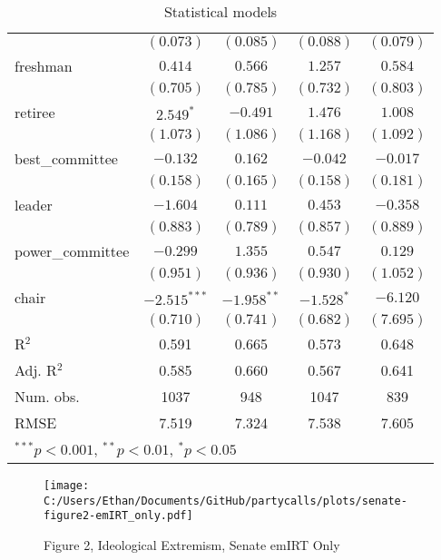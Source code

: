 \documentclass[12pt]{article}
\begin{document}
\begin{table}
\begin{center}
\begin{tabular}{l c c c c }
			& $(0.073)$      & $(0.085)$     & $(0.088)$     & $(0.079)$     \\
			freshman               & $0.414$        & $0.566$       & $1.257$       & $0.584$       \\
			& $(0.705)$      & $(0.785)$     & $(0.732)$     & $(0.803)$     \\
			retiree                & $2.549^{*}$    & $-0.491$      & $1.476$       & $1.008$       \\
			& $(1.073)$      & $(1.086)$     & $(1.168)$     & $(1.092)$     \\
			best\_committee        & $-0.132$       & $0.162$       & $-0.042$      & $-0.017$      \\
			& $(0.158)$      & $(0.165)$     & $(0.158)$     & $(0.181)$     \\
			leader                 & $-1.604$       & $0.111$       & $0.453$       & $-0.358$      \\
			& $(0.883)$      & $(0.789)$     & $(0.857)$     & $(0.889)$     \\
			power\_committee       & $-0.299$       & $1.355$       & $0.547$       & $0.129$       \\
			& $(0.951)$      & $(0.936)$     & $(0.930)$     & $(1.052)$     \\
			chair                  & $-2.515^{***}$ & $-1.958^{**}$ & $-1.528^{*}$  & $-6.120$      \\
			& $(0.710)$      & $(0.741)$     & $(0.682)$     & $(7.695)$     \\
			\hline
			R$^2$                  & 0.591          & 0.665         & 0.573         & 0.648         \\
			Adj. R$^2$             & 0.585          & 0.660         & 0.567         & 0.641         \\
			Num. obs.              & 1037           & 948           & 1047          & 839           \\
			RMSE                   & 7.519          & 7.324         & 7.538         & 7.605         \\
			\hline
			\multicolumn{5}{l}{\scriptsize{$^{***}p<0.001$, $^{**}p<0.01$, $^*p<0.05$}}
		\end{tabular}
		\caption{Statistical models}
		\label{table:coefficients}
	\end{center}
\end{table}
			
			

\begin{figure}[h]
	\caption{Figure 2, Ideological Extremism, Senate emIRT Only}
	\centering
	\texttt{[image: C:/Users/Ethan/Documents/GitHub/partycalls/plots/senate-figure2-emIRT\_only.pdf]}
	
\end{figure}	
			
\end{document}
